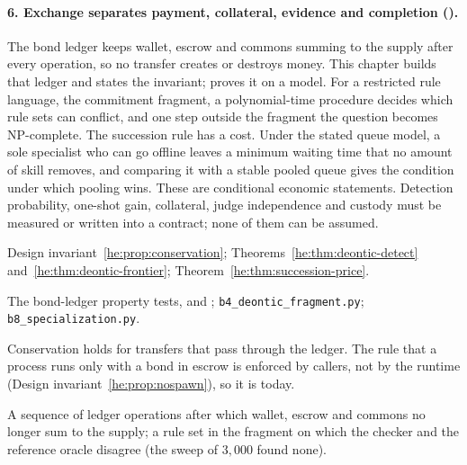 \paragraph{6. Exchange separates payment, collateral, evidence and completion ().}
The bond ledger keeps wallet, escrow and commons summing to the supply after
every operation, so no transfer creates or destroys money. This chapter builds
that ledger and states the invariant; 
proves it on a model. For a restricted rule language, the commitment fragment,
a polynomial-time procedure decides which rule sets can conflict, and one step
outside the fragment the question becomes NP-complete. The succession rule has
a cost. Under the stated queue model, a sole specialist who can go offline
leaves a minimum waiting time that no amount of skill removes, and comparing it
with a stable pooled queue gives the condition under which pooling wins. These
are conditional economic statements. Detection probability, one-shot gain,
collateral, judge independence and custody must be measured or written into a
contract; none of them can be assumed.
\begin{description}[leftmargin=1.4em,itemsep=1pt]
  \item[Result] Design invariant~\ref{he:prop:conservation};
  Theorems~\ref{he:thm:deontic-detect} and~\ref{he:thm:deontic-frontier};
  Theorem~\ref{he:thm:succession-price}.
  \item[Artifact] The bond-ledger property tests,
   and
  ;
  \texttt{b4\_deontic\_fragment.py}; \texttt{b8\_specialization.py}.
  \item[Mode] Conservation holds for transfers that pass through the ledger.
  The rule that a process runs only with a bond in escrow is enforced by
  callers, not by the runtime (Design invariant~\ref{he:prop:nospawn}), so it
  is  today.
  \item[Falsifier] A sequence of ledger operations after which wallet, escrow
  and commons no longer sum to the supply; a rule set in the fragment on which
  the checker and the reference oracle disagree (the sweep of $3{,}000$ found
  none).
\end{description}


